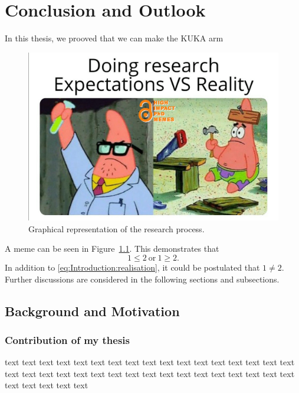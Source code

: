 \chapter{Conclusion and Outlook} \label{ch:Conclusion and Outlook}

In this thesis, we prooved that we can make the KUKA arm

\begin{figure}[ht!]
    \centering
    \includegraphics[width=\textwidth]{03_images/meme.png}
    \caption{Graphical representation of the research process.}
    \label{fig:Introduction:meme}
\end{figure}


A meme can be seen in Figure~\ref*{fig:Introduction:meme}. This demonstrates that 
\begin{equation} \label{eq:Introduction:realisation}
	1 \le 2 \ \text{or} \ 1 \ge 2.
\end{equation}
In addition to \eqref{eq:Introduction:realisation}, it could be postulated that $1 \ne 2$. Further discussions are considered in the following sections and subsections.

\section{Background and Motivation} \label{sec:Introduction:Background}

\subsection{Contribution of my thesis}

text text text text text text text text text text text text text text text text text text text text text text text text text text text text text text text text text text text text text text text 